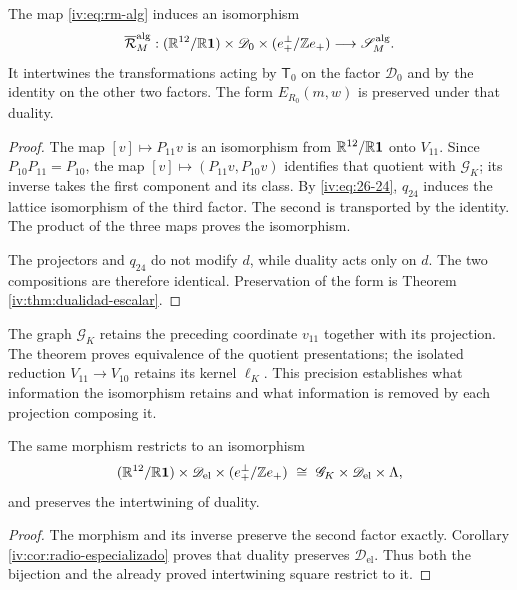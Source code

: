 \begin{theorem}
\label{iv:thm:pantallas-isomorfas}
\label{thm:k-pantallas-coordinadas}
The map \eqref{iv:eq:rm-alg} induces an isomorphism
\[
 \overline{\mathcal R}_M^{\mathrm{alg}}:
 (\mathbb R^{12}/\mathbb R\mathbf1)\times\mathscr D_0
 \times(e_+^\perp/\mathbb Z e_+)
 \longrightarrow\mathscr S_M^{\mathrm{alg}}.
\]
It intertwines the transformations acting by \(\mathsf T_0\)
on the factor \(\mathscr D_0\) and by the identity on the
other two factors. The form \(E_{R_0}(m,w)\) is preserved
under that duality.
\end{theorem}
\begin{proof}
The map \([v]\mapsto P_{11}v\) is an isomorphism
from \(\mathbb R^{12}/\mathbb R\mathbf1\) onto \(V_{11}\).
Since \(P_{10}P_{11}=P_{10}\), the map
\([v]\mapsto(P_{11}v,P_{10}v)\) identifies that quotient
with \(\mathscr G_K\); its inverse takes the first component
and its class. By \eqref{iv:eq:26-24}, \(q_{24}\) induces the
lattice isomorphism of the third factor. The second is
transported by the identity. The product of the three
maps proves the isomorphism.

The projectors and \(q_{24}\) do not modify \(d\), while
duality acts only on \(d\). The two
compositions are therefore identical. Preservation of the form
is Theorem \ref{iv:thm:dualidad-escalar}.
\end{proof}

The graph \(\mathscr G_K\) retains the preceding coordinate
\(v_{11}\) together with its projection. The theorem proves
equivalence of the quotient presentations; the isolated reduction
\(V_{11}\to V_{10}\) retains its kernel
\(\ell_K\). This precision establishes what information
the isomorphism retains and what information is removed by each
projection composing it.

\begin{corollary}
The same morphism restricts to an isomorphism
\[
 (\mathbb R^{12}/\mathbb R\mathbf1)\times\mathscr D_{\mathrm{el}}
 \times(e_+^\perp/\mathbb Z e_+)
 \ \cong\ \mathscr G_K\times\mathscr D_{\mathrm{el}}\times\Lambda,
\]
and preserves the intertwining of duality.
\end{corollary}
\begin{proof}
The morphism and its inverse preserve the second factor exactly.
Corollary \ref{iv:cor:radio-especializado} proves that duality
preserves \(\mathscr D_{\mathrm{el}}\). Thus both the bijection
and the already proved intertwining square restrict to it.
\end{proof}

